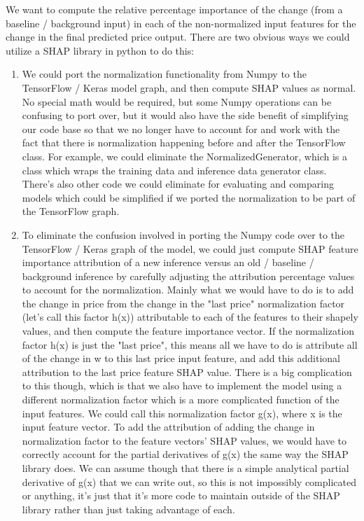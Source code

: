 \documentclass{article}
\begin{document}
We want to compute the relative percentage importance of the change (from a baseline / background input) in each of the non-normalized input features for the change in the final predicted price output. There are two obvious ways we could utilize a SHAP library in python to do this:

\begin{enumerate}
    \item We could port the normalization functionality from Numpy to the TensorFlow / Keras model graph, and then compute SHAP values as normal. No special math would be required, but some Numpy operations can be confusing to port over, but it would also have the side benefit of simplifying our code base so that we no longer have to account for and work with the fact that there is normalization happening before and after the TensorFlow class. For example, we could eliminate the NormalizedGenerator, which is a class which wraps the training data and inference data generator class. There's also other code we could eliminate for evaluating and comparing models which could be simplified if we ported the normalization to be part of the TensorFlow graph.
    \item To eliminate the confusion involved in porting the Numpy code over to the TensorFlow / Keras graph of the model, we could just compute SHAP feature importance attribution of a new inference versus an old / baseline / background inference by carefully adjusting the attribution percentage values to account for the normalization. Mainly what we would have to do is to add the change in price from the change in the "last price" normalization factor (let's call this factor h(x)) attributable to each of the features to their shapely values, and then compute the feature importance vector. If the normalization factor h(x) is just the "last price", this means all we have to do is attribute all of the change in w to this last price input feature, and add this additional attribution to the last price feature SHAP value. There is a big complication to this though, which is that we also have to implement the model using a different normalization factor which is a more complicated function of the input features. We could call this normalization factor g(x), where x is the input feature vector. To add the attribution of adding the change in normalization factor to the feature vectors' SHAP values, we would have to correctly account for the partial derivatives of g(x) the same way the SHAP library does. We can assume though that there is a simple analytical partial derivative of g(x) that we can write out, so this is not impossibly complicated or anything, it's just that it's more code to maintain outside of the SHAP library rather than just taking advantage of each.
\end{enumerate}
\end{document}
